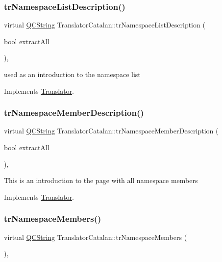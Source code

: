 \subsubsection{\texorpdfstring{trNamespaceListDescription()}{trNamespaceListDescription()}}
{\footnotesize\ttfamily virtual \mbox{\hyperlink{class_q_c_string}{Q\+C\+String}} Translator\+Catalan\+::tr\+Namespace\+List\+Description (\begin{DoxyParamCaption}\item[{bool}]{extract\+All }\end{DoxyParamCaption})\hspace{0.3cm}{\ttfamily [inline]}, {\ttfamily [virtual]}}

used as an introduction to the namespace list 

Implements \mbox{\hyperlink{class_translator}{Translator}}.

\mbox{\label{class_translator_catalan_a2b78cc81010bada55abd76b97776b773}} 
\subsubsection{\texorpdfstring{trNamespaceMemberDescription()}{trNamespaceMemberDescription()}}
{\footnotesize\ttfamily virtual \mbox{\hyperlink{class_q_c_string}{Q\+C\+String}} Translator\+Catalan\+::tr\+Namespace\+Member\+Description (\begin{DoxyParamCaption}\item[{bool}]{extract\+All }\end{DoxyParamCaption})\hspace{0.3cm}{\ttfamily [inline]}, {\ttfamily [virtual]}}

This is an introduction to the page with all namespace members 

Implements \mbox{\hyperlink{class_translator}{Translator}}.

\mbox{\label{class_translator_catalan_aab89a8c98b908f168d07e6e54933f43f}} 
\subsubsection{\texorpdfstring{trNamespaceMembers()}{trNamespaceMembers()}}
{\footnotesize\ttfamily virtual \mbox{\hyperlink{class_q_c_string}{Q\+C\+String}} Translator\+Catalan\+::tr\+Namespace\+Members (\begin{DoxyParamCaption}{ }\end{DoxyParamCaption})\hspace{0.3cm}{\ttfamily [inline]}, {\ttfamily [virtual]}}

